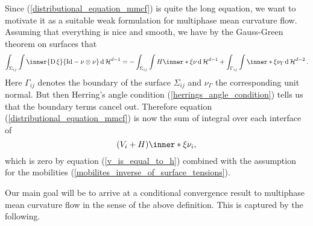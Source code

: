 Since (\ref{distributional_equation_mmcf}) is quite the long equation, we want 
to motivate it as a suitable weak formulation for multiphase mean curvature 
flow. 
Assuming that everything is nice and smooth, we have by the 
Gauss-Green theorem on surfaces 
\cite[Thm.~11.8]{maggi_sets_of_finite_perimeter} that
\begin{equation*}
	\int_{ \Sigma_{ i j } }
	\int 
	\inner{ \diff \xi }{ \mathrm{Id} - \nu \otimes \nu }
	\dd{\hm^{ d- 1 }}
	=
	-
	\int_{ \Sigma_{ i j } }
	\int
	H \inner*{ \xi }{ \nu }
	\dd{\hm^{ d- 1 }}
	+
	\int_{ \Gamma_{ i j } }
	\int
	\inner*{ \xi }{ \nu_{ \Gamma } }
	\dd{ \hm^{ d - 2 } }.
\end{equation*}
Here $ \Gamma_{ i j } $ denotes the boundary of the surface $ \Sigma_{ i j 
} $ and $ \nu_{ \Gamma } $ the corresponding unit normal. But then Herring's 
angle condition 
(\ref{herrings_angle_condition}) tells us that the boundary terms cancel 
out. Therefore equation 
(\ref{distributional_equation_mmcf}) is now the sum of integral over
each interface of
\begin{equation*}
	(V_{ i } + H) \inner*{ \xi }{ \nu_{ i } },
\end{equation*}
which is zero by equation (\ref{v_is_equal_to_h}) combined with the 
assumption for the mobilities (\ref{mobilites_inverse_of_surface_tensions}).

Our main goal will be to arrive at a conditional convergence result 
to multiphase mean curvature flow in the sense of the above definition. 
This is captured by the following.

